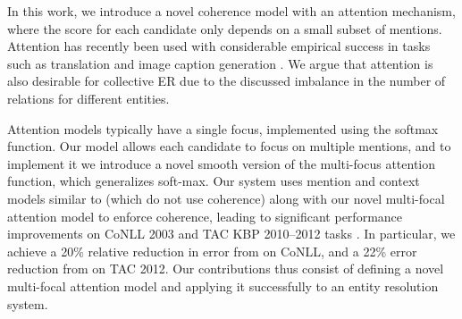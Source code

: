 


In this work, we introduce a novel coherence model with an attention mechanism, where the 
score for each candidate only depends on a small subset of mentions.
 Attention has recently been
used with considerable empirical success in tasks such as translation
\cite{bahdanau2014neural} and image caption generation
\cite{xu2015show}. We argue that attention is also desirable for
collective ER due to the discussed imbalance in the number of
relations for different entities.

Attention models typically have a single focus, implemented using the
 softmax function. Our model allows each candidate to
 focus on multiple mentions, and to implement it we introduce a 
 novel smooth version of the
 multi-focus attention function, which generalizes soft-max.
Our system uses mention and context models similar to  
 (which do not use coherence) along with our novel 
multi-focal attention model to 
enforce coherence, leading to significant performance improvements
on CoNLL 2003 \cite{Hoffart2011} and TAC KBP 2010--2012 tasks \cite{TAC2010,TAC2011,TAC2012}.
In particular, we achieve a 20\% relative reduction
in error from  on CoNLL, and a 
22\% error reduction from  on TAC 2012.
Our contributions thus consist of defining a novel multi-focal
attention model and applying it
successfully to an entity resolution system.




